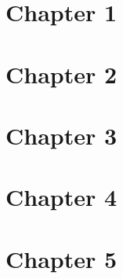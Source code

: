 \documentclass{formulae}
\begin{document}
\begin{multicols*}{2}

    \section{Chapter 1}
    

    \section{Chapter 2}
    

    \section{Chapter 3}
    

    \section{Chapter 4}
    

    \section{Chapter 5}
    

\end{multicols*}
\end{document}
